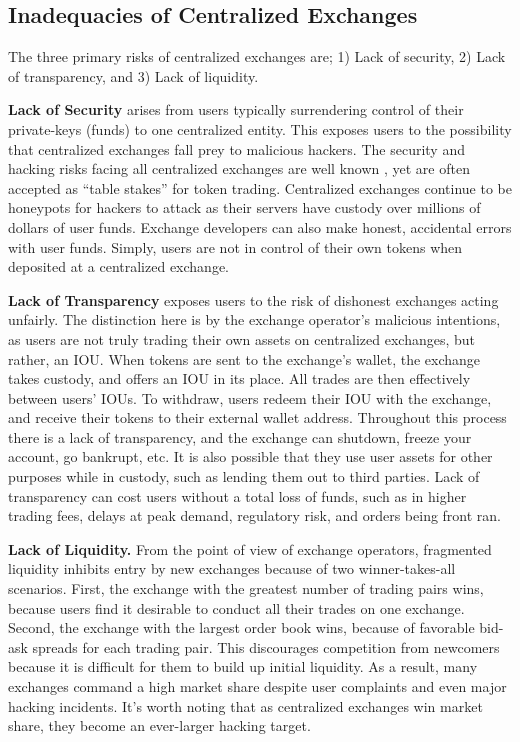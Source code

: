 \documentclass[UTF8,nofonts]{article}
\begin{document}
\begin{multicols}{2}
\subsection{Inadequacies of Centralized Exchanges}
The three primary risks of centralized exchanges are; 1) Lack of security, 2) Lack of transparency, and 3) Lack of liquidity.

\textbf{Lack of Security} arises from users typically surrendering control of their private-keys (funds) to one centralized entity. This exposes users to the possibility that centralized exchanges fall prey to malicious hackers. The security and hacking risks facing all centralized exchanges are well known \cite{coincheckhack}  \cite{mcmillan2014inside}, yet are often accepted as \enquote{table stakes} for token trading. Centralized exchanges continue to be honeypots for hackers to attack as their servers have custody over millions of dollars of user funds. Exchange developers can also make honest, accidental errors with user funds. Simply, users are not in control of their own tokens when deposited at a centralized exchange.

\textbf{Lack of Transparency} exposes users to the risk of dishonest exchanges acting unfairly. The distinction here is by the exchange operator's malicious intentions, as users are not truly trading their own assets on centralized exchanges, but rather, an IOU. When tokens are sent to the exchange's wallet, the exchange takes custody, and offers an IOU in its place. All trades are then effectively between users' IOUs. To withdraw, users redeem their IOU with the exchange, and receive their tokens to their external wallet address. Throughout this process there is a lack of transparency, and the exchange can shutdown, freeze your account, go bankrupt, etc. It is also possible that they use user assets for other purposes while in custody, such as lending them out to third parties. Lack of transparency can cost users without a total loss of funds, such as in higher trading fees, delays at peak demand, regulatory risk, and orders being front ran.

\textbf{Lack of Liquidity.} From the point of view of exchange operators, fragmented liquidity inhibits entry by new exchanges because of two winner-takes-all scenarios. First, the exchange with the greatest number of trading pairs wins, because users find it desirable to conduct all their trades on one exchange. Second, the exchange with the largest order book wins, because of favorable bid-ask spreads for each trading pair. This discourages competition from newcomers because it is difficult for them to build up initial liquidity. As a result, many exchanges command a high market share despite user complaints and even major hacking incidents. It's worth noting that as centralized exchanges win market share, they become an ever-larger hacking target.


\end{multicols}
\end{document}
